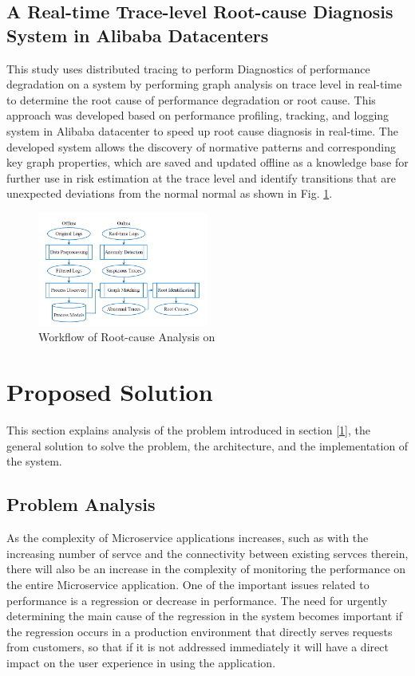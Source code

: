 \documentclass[conference]{configs/IEEEtran}
\begin{document}
\subsection{A Real-time Trace-level Root-cause Diagnosis System in Alibaba Datacenters}
This study \cite{rca-alibaba} uses distributed tracing to perform
Diagnostics of performance degradation on a system by performing graph analysis on
trace level in real-time to determine the root cause of performance degradation or
root cause. This approach was developed based on performance profiling, tracking, and logging system in Alibaba datacenter to speed up root cause diagnosis in real-time. The developed system allows the discovery of normative patterns and corresponding key graph properties, which are saved and updated offline as a knowledge base for further use in risk estimation at the trace level and identify transitions that are unexpected deviations from the normal
normal as shown in Fig. \ref{rca-framwork}.
\begin{figure}[htb]
	\centering
	\includegraphics[width=0.5\textwidth]{resources/ch2/rca-framework.png}
	\caption{Workflow of Root-cause Analysis on \cite{rca-alibaba}}
	\label{rca-framwork}
\end{figure}

\section{Proposed Solution}
This section explains analysis of the problem introduced in section \ref{1}, the general solution to solve the problem, the architecture, and the implementation of the system.

\subsection{Problem Analysis}
As the complexity of Microservice applications increases, such as with the increasing number of servce and the connectivity between existing servces therein, there will also be an increase in the complexity of monitoring the performance on the entire Microservice application. One of the important issues related to performance is a regression or decrease in performance. The need for urgently determining the main cause of the regression in the system becomes important if the regression occurs in a production environment that directly serves requests from customers, so that if it is not addressed immediately it will have a direct impact on the
user experience in using the application.
\end{document}
